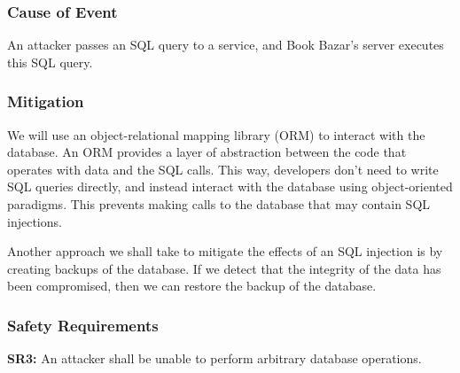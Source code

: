 \documentclass[fullpage]{article}
\begin{document}
\subsubsection*{Cause of Event}
An attacker passes an SQL query to a service, and Book Bazar’s server executes this SQL query.

\subsubsection*{Mitigation}
We will use an object-relational mapping library (ORM) to interact with the database. An ORM provides a layer of abstraction between the code that operates with data and the SQL calls. This way, developers don’t need to write SQL queries directly, and instead interact with the database using object-oriented paradigms. This prevents making calls to the database that may contain SQL injections.

Another approach we shall take to mitigate the effects of an SQL injection is by creating backups of the database. If we detect that the integrity of the data has been compromised, then we can restore the backup of the database.

\subsubsection*{Safety Requirements}
\textbf{SR3: }An attacker shall be unable to perform arbitrary database operations.

\begin{comment}
\begin{thebibliography}{9}

\bibitem{website}
S. Liu, “Canada most popular desktop browsers 2021,” Statista, 04-Oct-2021. [Online]. Available: https://www.statista.com/statistics/499462/most-popular-desktop-browsers-in-canada-by-market-share/. [Accessed: 17-Oct-2021].

\end{thebibliography}
\end{comment}
\end{document}
